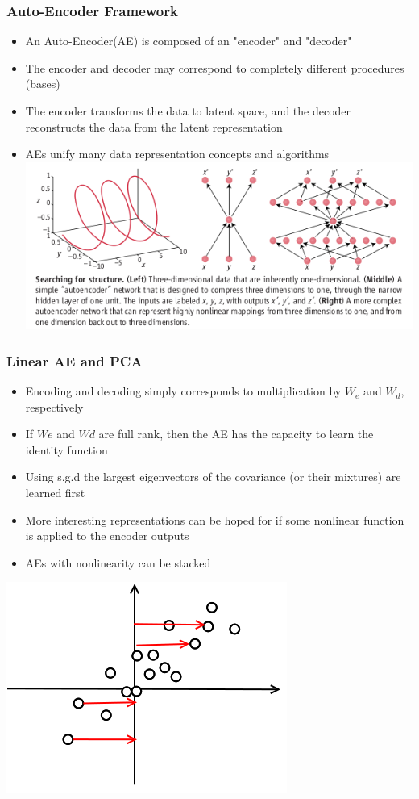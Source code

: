 \documentclass{beamer}
\begin{document}
\begin{frame}
\frametitle{Auto-Encoder Framework} 
\begin{itemize}
\item{An Auto-Encoder(AE) is composed of an "encoder" and "decoder"}
\item{The encoder and decoder may correspond to completely different procedures (bases)}
\item{The encoder transforms the data to latent space, and the decoder reconstructs the data from the latent representation}  
\item{AEs unify many data representation concepts and algorithms} 
\includegraphics[scale = 0.4]{autoenc.png} 
\end{itemize} 
\end{frame} 

\begin{frame}
\frametitle{Linear AE and PCA} 
\begin{itemize}
\item{Encoding and decoding simply corresponds to multiplication by $W_e$ and $W_d$, respectively}
\item{If $We$ and $Wd$ are full rank, then the AE has the capacity to learn the identity function}  
\item{Using s.g.d the largest eigenvectors of the covariance (or their mixtures) are learned first}
\item{More interesting representations can be hoped for if some nonlinear function is applied to the encoder outputs}
\item{AEs with nonlinearity can be stacked}
\end{itemize}  
\begin{center}
\includegraphics[scale = 0.4]{stochasticPCA.png} 
\end{center} 
\end{frame} 
\end{document}
